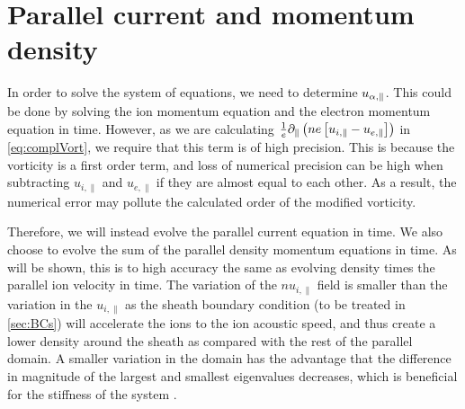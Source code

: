 \section{Parallel current and momentum density}
%
In order to solve the system of equations, we need to determine $u_{\alpha,\|}$.
This could be done by solving the ion momentum equation and the electron momentum equation in time.
However, as we are calculating $\frac{1}{e}\partial_\|\left(ne\left[u_{i,\|} - u_{e,\|}\right]\right)$ in \cref{eq:complVort}, we require that this term is of high precision.
This is because the vorticity is a first order term, and loss of numerical precision can be high when subtracting $u_{i,\|}$ and $u_{e,\|}$ if they are almost equal to each other.
As a result, the numerical error may pollute the calculated order of the modified vorticity.

Therefore, we will instead evolve the parallel current equation in time.
We also choose to evolve the sum of the parallel density momentum equations in time.
As will be shown, this is to high accuracy the same as evolving density times the parallel ion velocity in time.
The variation of the $nu_{i,\|}$ field is smaller than the variation in the $u_{i,\|}$ as the sheath boundary condition (to be treated in \cref{sec:BCs}) will accelerate the ions to the ion acoustic speed, and thus create a lower density around the sheath as compared with the rest of the parallel domain.
A smaller variation in the domain has the advantage that the difference in magnitude of the largest and smallest eigenvalues decreases, which is beneficial for the stiffness of the system \cite{Leveque2007book}.

